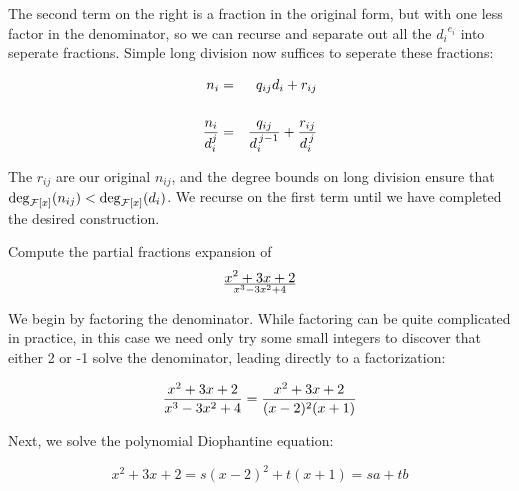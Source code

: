 The second term on the right is a fraction in the original form,
but with one less factor in the denominator, so we can recurse
and separate out all the ${d_i}^{e_i}$ into seperate fractions.
Simple long division now suffices to seperate these fractions:

\begin{eqnarray*}
n_i &=& q_{ij} d_i + r_{ij} \cr\cr
{{n_i}\over{d_i^j}} &=& {{q_{ij}}\over{d_i^{\,j-1}}} + {r_{ij}\over{d_i^{\,j}}} \cr
\end{eqnarray*}

The $r_{ij}$ are our original $n_{ij}$, and the degree bounds on long
division ensure that $\deg_{{\cal F}[x]}(n_{ij}) < \deg_{{\cal F}[x]}(d_i)$.
We recurse on the first term until we have completed the desired construction.

\vfill\eject

\example

Compute the partial fractions expansion of $${x^2 + 3x + 2}\over{x^3-3x^2+4}$$

We begin by factoring the denominator.  While factoring can be quite
complicated in practice, in this case we need only try some small
integers to discover that either 2 or -1 solve the denominator,
leading directly to a factorization:

\begin{comment}
Differentiating to obtain $3x^2-6x$.
Computing the GCD of $x^3-3x^2+4$ and $3x^2-6x$:



Thus, $-2x+4$ is a GCD, which we normalize by dividing through by -2
to obtain $x-2$.  We could now proceed by dividing $x^3-3x^2+4$ by
$x-2$ to obtain $x^2-x-2$ (all factors at unit power), compute the GCD
of $x-2$ and $x^2-x-2$ to obtain $x-2$ (all higher factors at unit
power), divide $x^2-x-2$ by $x-2$ to obtain $x+1$ (the unit
square-free factor), and repeat the process (trivially) with $x-2$ to
decide that $x-2$ is the second square-free factor.  Or, we could
shortcut the entire process by noting that since $x-2$ is linear,
it can only be the second square-free factor.  In any event, we conclude that:

\end{comment}

$${{x^2 + 3x + 2}\over{x^3-3x^2+4}} = {{x^2 + 3x + 2}\over{(x-2)^2(x+1)}}$$

Next, we solve the polynomial Diophantine equation:

$$x^2 + 3x + 2 = s(x-2)^2 + t(x+1) = sa+tb$$

